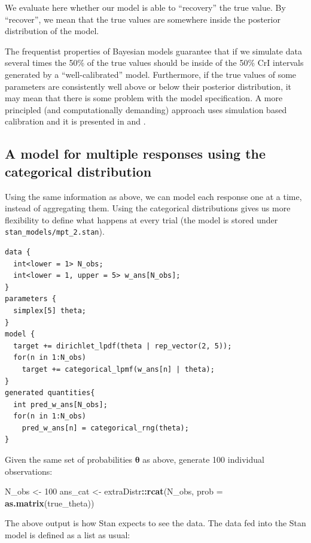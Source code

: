 \documentclass[12pt,]{krantz}
\newenvironment{Shaded}{\begin{snugshade}}{\end{snugshade}}
\newcommand{\KeywordTok}[1]{\textcolor[rgb]{0.13,0.29,0.53}{\textbf{#1}}}
\newcommand{\DataTypeTok}[1]{\textcolor[rgb]{0.13,0.29,0.53}{#1}}
\newcommand{\DecValTok}[1]{\textcolor[rgb]{0.00,0.00,0.81}{#1}}
\newcommand{\StringTok}[1]{\textcolor[rgb]{0.31,0.60,0.02}{#1}}
\newcommand{\OperatorTok}[1]{\textcolor[rgb]{0.81,0.36,0.00}{\textbf{#1}}}
\newcommand{\NormalTok}[1]{#1}
\theoremstyle{definition}
\theoremstyle{definition}
\theoremstyle{definition}
\theoremstyle{remark}
\begin{document}
We evaluate here whether our model is able to ``recovery'' the true
value. By ``recover'', we mean that the true values are somewhere inside
the posterior distribution of the model.

The frequentist properties of Bayesian models guarantee that if we
simulate data several times the 50\% of the true values should be inside
of the 50\% CrI intervals generated by a ``well-calibrated'' model.
Furthermore, if the true values of some parameters are consistently well
above or below their posterior distribution, it may mean that there is
some problem with the model specification. A more principled (and
computationally demanding) approach uses simulation based calibration
and it is presented in \citet{talts2018validating} and
\citet{schad2020toward}.

\subsection{A model for multiple responses using the categorical
distribution}\label{sec:cat}

Using the same information as above, we can model each response one at a
time, instead of aggregating them. Using the categorical distributions
gives us more flexibility to define what happens at every trial (the
model is stored under \texttt{stan\_models/mpt\_2.stan}).

\begin{verbatim}
data {
  int<lower = 1> N_obs;
  int<lower = 1, upper = 5> w_ans[N_obs];
}
parameters {
  simplex[5] theta;
}
model {
  target += dirichlet_lpdf(theta | rep_vector(2, 5));
  for(n in 1:N_obs)
    target += categorical_lpmf(w_ans[n] | theta);
}
generated quantities{
  int pred_w_ans[N_obs];
  for(n in 1:N_obs)
    pred_w_ans[n] = categorical_rng(theta);
}
\end{verbatim}

Given the same set of probabilities \(\boldsymbol{\theta}\) as above,
generate 100 individual observations:

\begin{Shaded}
\begin{Highlighting}[]
\NormalTok{N_obs <-}\StringTok{ }\DecValTok{100}
\NormalTok{ans_cat <-}\StringTok{ }\NormalTok{extraDistr}\OperatorTok{::}\KeywordTok{rcat}\NormalTok{(N_obs, }\DataTypeTok{prob =} \KeywordTok{as.matrix}\NormalTok{(true_theta))}
\end{Highlighting}
\end{Shaded}

The above output is how Stan expects to see the data. The data fed into
the Stan model is defined as a list as usual:
\end{document}
